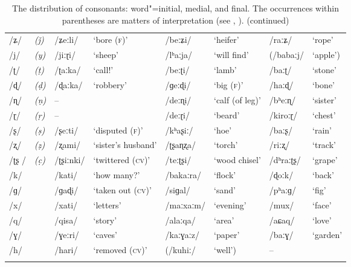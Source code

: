 \addtocounter{table}{-1}
\begin{sidewaystable}[p!]
\caption{The distribution of consonants: word"=initial, medial, and final. The
  occurrences within parentheses are matters of interpretation (see , ). (continued)}
\begin{tabularx}{\textwidth}{ l@{\hspace{20pt}} l@{\hspace{20pt}} Q l@{\hspace{20pt}} Q Q Q Q }
\lsptoprule
/ʑ/ &
\textit{(ǰ)} &
/ʑeːli/ &
`bore (\textsc{f)}' &
/beːʑi/ &
`heifer' &
/raːʑ/ &
`rope'\\
/j/ &
\textit{(y)} &
/jiːɽi/ &
`sheep' &
/lʰaːja/ &
`will find' &
(/babaːj/ &
`apple')\\
/ʈ/ &
\textit{(ṭ)} &
/ʈaːka/ &
`call!' &
/beːʈi/ &
`lamb' &
/baːʈ/ &
`stone'\\
/ɖ/ &
\textit{(ḍ)} &
/ɖaːka/ &
`robbery' &
/ɡeːɖi/ &
`big (\textsc{f)}' &
/haːɖ/ &
`bone'\\
/ɳ/ &
\textit{(ṇ)} &
-- &
&
/deːɳi/ &
`calf (of leg)' &
/bʰeːɳ/ &
`sister'\\
/ɽ/ &
\textit{(ṛ)} &
-- &
&
/deːɽi/ &
`beard' &
/kiroːɽ/ &
`chest'\\
/ʂ/ &
\textit{(ṣ)} &
/ʂeːti/ &
`disputed (\textsc{f)}' &
/kʰaʂiː/ &
`hoe' &
/baːʂ/ &
`rain'\\
/ʐ/ &
\textit{(ẓ)} &
/ʐami/ &
`sister's husband' &
/ʈʂaɳʐa/ &
`torch' &
/riːʐ/ &
`track'\\
/ʈʂ / &
\textit{(c̣)} &
/ʈʂiːnki/ &
`twittered (\textsc{cv)}' &
/teːʈʂi/ &
`wood chisel' &
/dʰraːʈʂ/ &
`grape'\\
/k/ &
&
/kati/ &
`how many?' &
/bakaːra/ &
`flock' &
/ɖoːk/ &
`back'\\
/ɡ/ &
&
/ɡaɖi/ &
`taken out (\textsc{cv)}' &
/siɡal/ &
`sand' &
/pʰaːɡ/ &
`fig'\\
/x/ &
&
/xati/ &
`letters' &
/maːxaːm/ &
`evening' &
/mux/ &
`face'\\
/q/ &
&
/qisa/ &
`story' &
/alaːqa/ &
`area' &
/aɕaq/ &
`love'\\
/ɣ/ &
&
/ɣeːri/ &
`caves' &
/kaːɣaːz/ &
`paper' &
/baːɣ/ &
`garden'\\
/h/ &
&
/hari/ &
`removed \textsc{(cv)}' &
(/kuhiː/ &
`well') &
-- &
\\\lspbottomrule
\end{tabularx}
\label{tab:3-2}
\end{sidewaystable}




